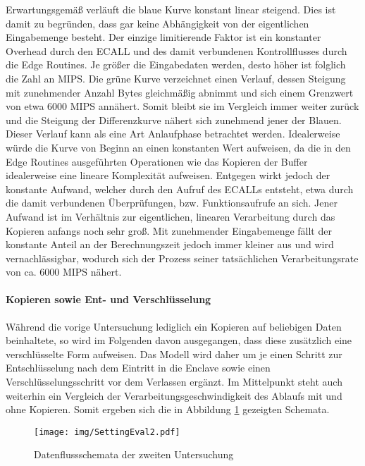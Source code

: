 Erwartungsgemäß verläuft die blaue Kurve konstant linear steigend. Dies ist damit zu begründen, dass  gar keine Abhängigkeit von der eigentlichen Eingabemenge besteht. Der einzige limitierende Faktor ist ein konstanter Overhead durch den ECALL und des damit verbundenen Kontrollflusses durch die Edge Routines. Je größer die Eingabedaten werden, desto höher ist folglich die Zahl an MIPS. Die grüne Kurve verzeichnet einen Verlauf, dessen Steigung mit zunehmender Anzahl Bytes gleichmäßig abnimmt und sich einem Grenzwert von etwa 6000 MIPS annähert. Somit bleibt sie im Vergleich immer weiter zurück und die Steigung der Differenzkurve nähert sich zunehmend jener der Blauen. Dieser Verlauf kann als eine Art Anlaufphase betrachtet werden. Idealerweise würde die Kurve von Beginn an einen konstanten Wert aufweisen, da die in den Edge Routines ausgeführten Operationen wie das Kopieren der Buffer idealerweise eine lineare Komplexität aufweisen. Entgegen wirkt jedoch der konstante Aufwand, welcher durch den Aufruf des ECALLs entsteht, etwa durch die damit verbundenen Überprüfungen, bzw. Funktionsaufrufe an sich. Jener Aufwand ist im Verhältnis zur eigentlichen, linearen Verarbeitung durch das Kopieren anfangs noch sehr groß. Mit zunehmender Eingabemenge fällt der konstante Anteil an der Berechnungszeit jedoch immer kleiner aus und wird vernachlässigbar, wodurch sich der Prozess seiner tatsächlichen Verarbeitungsrate von ca. 6000 MIPS nähert.

\paragraph{Kopieren sowie Ent- und Verschlüsselung}

Während die vorige Untersuchung lediglich ein Kopieren auf beliebigen Daten beinhaltete, so wird im Folgenden davon ausgegangen, dass diese zusätzlich eine verschlüsselte Form aufweisen. Das Modell wird daher um je einen Schritt zur Entschlüsselung nach dem Eintritt in die Enclave sowie einen Verschlüsselungsschritt vor dem Verlassen ergänzt. Im Mittelpunkt steht auch weiterhin ein Vergleich der Verarbeitungsgeschwindigkeit des Ablaufs mit und ohne Kopieren. Somit ergeben sich die in Abbildung \ref{fig:settingeval2} gezeigten Schemata.

\begin{figure}[h]
	\texttt{[image: img/SettingEval2.pdf]}
	\centering
	\caption{Datenflussschemata der zweiten Untersuchung}
	\label{fig:settingeval2}
\end{figure}

